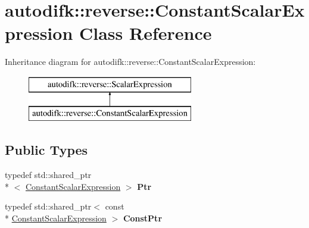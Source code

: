 \hypertarget{classautodifk_1_1reverse_1_1_constant_scalar_expression}{\section{autodifk\-:\-:reverse\-:\-:Constant\-Scalar\-Expression Class Reference}
\label{classautodifk_1_1reverse_1_1_constant_scalar_expression}
}
Inheritance diagram for autodifk\-:\-:reverse\-:\-:Constant\-Scalar\-Expression\-:\begin{figure}[H]
\begin{center}
\leavevmode
\includegraphics[height=2.000000cm]{classautodifk_1_1reverse_1_1_constant_scalar_expression}
\end{center}
\end{figure}
\subsection*{Public Types}
\begin{DoxyCompactItemize}
\item 
\hypertarget{classautodifk_1_1reverse_1_1_constant_scalar_expression_abfe0e0ee401cbef9e89ba750f78de53e}{typedef std\-::shared\-\_\-ptr\\*
$<$ \hyperlink{classautodifk_1_1reverse_1_1_constant_scalar_expression}{Constant\-Scalar\-Expression} $>$ {\bfseries Ptr}}\label{classautodifk_1_1reverse_1_1_constant_scalar_expression_abfe0e0ee401cbef9e89ba750f78de53e}

\item 
\hypertarget{classautodifk_1_1reverse_1_1_constant_scalar_expression_aa7369d7143a4b60b070c1fccfd96935a}{typedef std\-::shared\-\_\-ptr$<$ const \\*
\hyperlink{classautodifk_1_1reverse_1_1_constant_scalar_expression}{Constant\-Scalar\-Expression} $>$ {\bfseries Const\-Ptr}}\label{classautodifk_1_1reverse_1_1_constant_scalar_expression_aa7369d7143a4b60b070c1fccfd96935a}

\end{DoxyCompactItemize}
